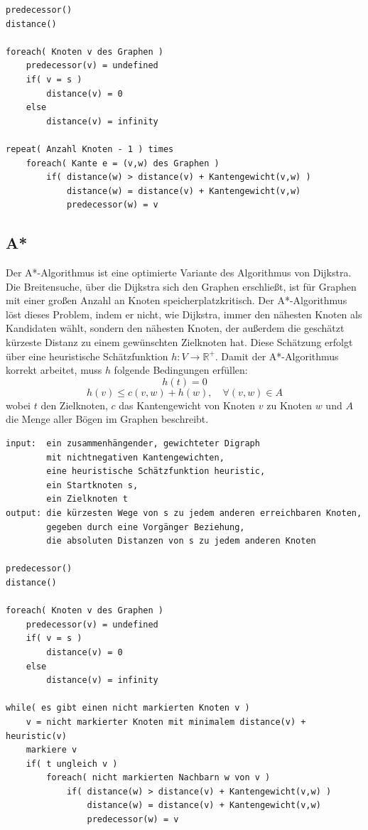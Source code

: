 \documentclass[10pt,a4paper,landscape]{article}
\begin{document}
\begin{multicols*}{2}
\begin{verbatim}
predecessor()
distance()

foreach( Knoten v des Graphen )
    predecessor(v) = undefined
    if( v = s )
        distance(v) = 0
    else
        distance(v) = infinity

repeat( Anzahl Knoten - 1 ) times
    foreach( Kante e = (v,w) des Graphen )
        if( distance(w) > distance(v) + Kantengewicht(v,w) )
            distance(w) = distance(v) + Kantengewicht(v,w)
            predecessor(w) = v
    \end{verbatim}

    \subsection{ A* }
    Der A*-Algorithmus ist eine optimierte Variante des Algorithmus von Dijkstra. Die Breitensuche, über die Dijkstra sich den 
    Graphen erschließt, ist für Graphen mit einer großen Anzahl an Knoten speicherplatzkritisch. Der A*-Algorithmus löst dieses 
    Problem, indem er nicht, wie Dijkstra, immer den nähesten Knoten als Kandidaten wählt, sondern den nähesten Knoten, der außerdem 
    die geschätzt kürzeste Distanz zu einem gewünschten Zielknoten hat. Diese Schätzung erfolgt über eine heuristische 
    Schätzfunktion $h: V \rightarrow \mathbb{R}^+$.
    \newline
    Damit der A*-Algorithmus korrekt arbeitet, muss $h$ folgende Bedingungen erfüllen:
    \[ h(t) = 0 \]
    \[ h(v) \leq c(v,w) + h(w), \quad \forall (v,w) \in A \]
    wobei $t$ den Zielknoten, $c$ das Kantengewicht von Knoten $v$ zu Knoten $w$ und $A$ die Menge aller Bögen im Graphen beschreibt.
    \begin{verbatim}
input:  ein zusammenhängender, gewichteter Digraph 
        mit nichtnegativen Kantengewichten,
        eine heuristische Schätzfunktion heuristic,
        ein Startknoten s,
        ein Zielknoten t
output: die kürzesten Wege von s zu jedem anderen erreichbaren Knoten, 
        gegeben durch eine Vorgänger Beziehung,
        die absoluten Distanzen von s zu jedem anderen Knoten

predecessor()
distance()

foreach( Knoten v des Graphen )
    predecessor(v) = undefined
    if( v = s )
        distance(v) = 0
    else
        distance(v) = infinity

while( es gibt einen nicht markierten Knoten v )
    v = nicht markierter Knoten mit minimalem distance(v) + heuristic(v)
    markiere v
    if( t ungleich v )
        foreach( nicht markierten Nachbarn w von v )
            if( distance(w) > distance(v) + Kantengewicht(v,w) )
                distance(w) = distance(v) + Kantengewicht(v,w)
                predecessor(w) = v
    \end{verbatim}


\end{multicols*}
\end{document}
